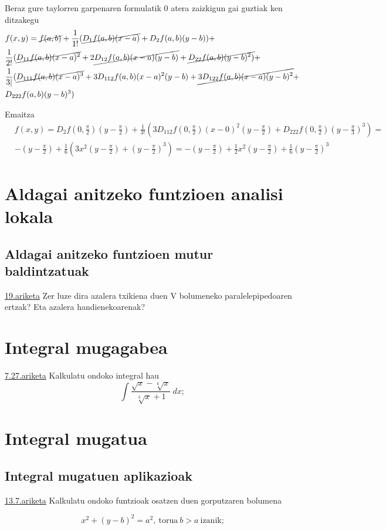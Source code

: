 Beraz gure taylorren garpenaren formulatik 0 atera zaizkigun gai guztiak ken ditzakegu
\begin{equation*}
\begin{split}
    &f(x,y)=\cancel{f(a,b)}+\frac{1}{1!}(\cancel{D_1f(a,b)(x-a)}+D_2f(a,b)(y-b))+\\
    &\frac{1}{2!}(\cancel{D_{11}f(a,b)(x-a)^2} +2 \cancel{D_{12}f(a,b)(x-a)(y-b)}+\cancel{D_{22}f(a,b)(y-b)^2)}+\\
    &\frac{1}{3|}(\cancel{D_{111}f(a,b)(x-a)^3}+3D_{112}f(a,b)(x-a)^2(y-b)+\cancel{3D_{122}f(a,b)(x-a)(y-b)^2}+\\
    &D_{222}f(a,b)(y-b)^3)
\end{split}
\end{equation*}

Emaitza
\begin{align*}
    &f(x,y)=D_2f(0,\frac{\pi}{2})\left(y-\frac{\pi}{2}\right)+\frac{1}{3!}\left(3D_{112}f(0,\frac{\pi}{2})(x-0)^2(y-\frac{\pi}{2})+ D_{222}f(0,\frac{\pi}{2})(y-\frac{\pi}{3})^3 \right)=\\
    &-\left(y-\frac{\pi}{2}\right)+\frac{1}{6}\left(3x^2(y-\frac{\pi}{2})+(y-\frac{\pi}{2})^3\right)=-\left(y-\frac{\pi}{2}\right)+\frac{1}{2}x^2\left(y-\frac{\pi}{2}\right)+\frac{1}{6}\left(y-\frac{\pi}{2}\right)^3
\end{align*}


\chapter{Aldagai anitzeko funtzioen analisi lokala}
\section{Aldagai anitzeko funtzioen mutur baldintzatuak}
\underline{19.ariketa} Zer luze dira azalera txikiena duen V bolumeneko paralelepipedoaren ertzak? Eta azalera handienekoarenak?



\chapter{Integral mugagabea}
\underline{7.27.ariketa} Kalkulatu ondoko integral hau
\begin{equation*}
    \int \frac{\sqrt{x}-\sqrt[6]{x}}{\sqrt[3]{x}+1}\ dx;
\end{equation*}



\chapter{Integral mugatua}
\section{Integral mugatuen aplikazioak}
\underline{13.7.ariketa} Kalkulatu ondoko funtzioak osatzen duen gorputzaren bolumena

\begin{equation*}
    x^2+(y-b)^2=a^2,\ \text{torua}\ b>a \ \text{izanik;}
\end{equation*}